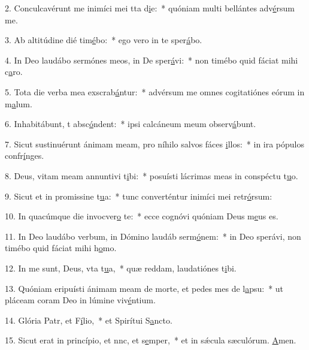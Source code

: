 2. Conculcavérunt me inimíci mei tta d\uline{i}e:~* quóniam multi bellántes adv\uline{é}rsum me.\par 
3. Ab altitúdine dié tim\uline{é}bo:~* ego vero in te sper\uline{á}bo.\par 
4. In Deo laudábo sermónes meos, in De sper\uline{á}vi:~* non timébo quid fáciat mihi c\uline{a}ro.\par 
5. Tota die verba mea exscrab\uline{á}ntur:~* advérsum me omnes cogitatiónes eórum in m\uline{a}lum.\par 
6. Inhabitábunt, t absc\uline{ó}ndent:~* ipsi calcáneum meum observ\uline{á}bunt.\par 
7. Sicut sustinuérunt ánimam meam, pro níhilo salvos fáces \uline{i}llos:~* in ira pópulos confr\uline{í}nges.\par 
8. Deus, vitam meam annuntivi t\uline{i}bi:~* posuísti lácrimas meas in conspéctu t\uline{u}o.\par 
9. Sicut et in promissine t\uline{u}a:~* tunc converténtur inimíci mei retr\uline{ó}rsum:\par 
10. In quacúmque die invocver\uline{o} te:~* ecce cognóvi quóniam Deus m\uline{e}us es.\par 
11. In Deo laudábo verbum, in Dómino laudáb serm\uline{ó}nem:~* in Deo sperávi, non timébo quid fáciat mihi h\uline{o}mo.\par 
12. In me sunt, Deus, vta t\uline{u}a,~* quæ reddam, laudatiónes t\uline{i}bi.\par 
13. Quóniam eripuísti ánimam meam de morte, et pedes mes de l\uline{a}psu:~* ut pláceam coram Deo in lúmine viv\uline{é}ntium.\par 
14. Glória Patr, et F\uline{í}lio,~* et Spirítui S\uline{a}ncto.\par 
15. Sicut erat in princípio, et nnc, et s\uline{e}mper,~* et in sǽcula sæculórum. \uline{A}men.\par 
